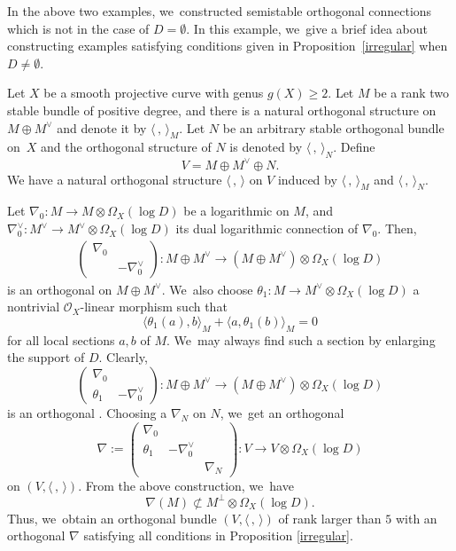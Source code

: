 \begin{examp}\label{exmp_idea}
In the above two examples, we~constructed semistable orthogonal connections which is not \grsemistable in the case of $D=\emptyset$. In this example, we~give a brief idea about constructing examples satisfying conditions given in Proposition~\ref{irregular} when $D\neq\emptyset$.

Let $X$ be a smooth projective curve with genus $g(X) \geq 2$. Let $M$ be a rank two stable bundle of positive degree, and there is a natural orthogonal structure on $M \oplus M^{\vee}$ and denote it by $\langle \,, \, \rangle_M$. Let $N$ be an arbitrary stable orthogonal bundle on~$X$ and the orthogonal structure of $N$ is denoted by $\langle \,, \, \rangle_N$. Define
\[
V=M\oplus M^\vee\oplus N.
\]
We have a natural orthogonal structure $\langle \,, \, \rangle$ on $V$ induced by $\langle \,, \, \rangle_M$ and $\langle \,, \, \rangle_N$.

Let $\nabla_0: M\to M\otimes\Omega_X(\log D)$ be a logarithmic \lconnection on $M$, and $\nabla_0^\vee: M^\vee \to M^\vee \otimes \Omega_X(\log D)$ its dual logarithmic connection of $\nabla_0$. Then,
\begin{align*}
\begin{pmatrix}
\nabla_0 & \\
& -\nabla^\vee_0
\end{pmatrix}: M \oplus M^\vee \to (M \oplus M^\vee) \otimes \Omega_X(\log D)
\end{align*}
is an orthogonal \lconnection on $M \oplus M^\vee$. We~also choose $\theta_1: M \to M^\vee \otimes \Omega_X(\log D)$ a nontrivial $\mathcal{O}_X$-linear morphism such that
\[
\langle \theta_1(a),b \rangle_M + \langle a,\theta_1(b) \rangle_M = 0
\]
for all local sections $a,b$ of $M$. We~may always find such a section by enlarging the support of $D$. Clearly,
\[
\begin{pmatrix}
\nabla_0 & \\
\theta_1 & -\nabla^\vee_0
\end{pmatrix}: M \oplus M^\vee \to (M \oplus M^\vee) \otimes \Omega_X(\log D)
\]
is an orthogonal \lconnection. Choosing a \lconnection $\nabla_N$ on $N$, we~get an orthogonal \lconnection
\[
\nabla:=
\begin{pmatrix}
\nabla_0 & & \\
\theta_1 & -\nabla^\vee_0 & \\
& & \nabla_N
\end{pmatrix}: V \to V \otimes \Omega_X(\log D)
\]
on $(V, \langle \,, \, \rangle)$. From the above construction, we~have
\[
\nabla(M)\not\subset M^\perp\otimes\Omega_X(\log D).
\]
Thus, we~obtain an orthogonal bundle $(V, \langle \,, \, \rangle)$ of rank larger than $5$ with an orthogonal \lconnection $\nabla$ satisfying all conditions in Proposition \ref{irregular}.
\end{examp}

